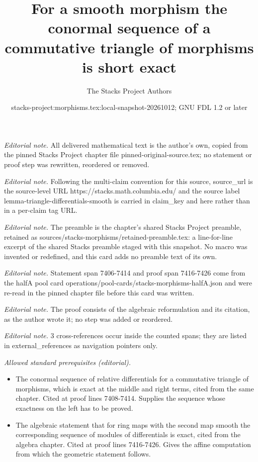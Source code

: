 \documentclass[10pt,a4paper]{amsart}
\title{For a smooth morphism the conormal sequence of a commutative triangle of morphisms is short exact}
\author{The Stacks Project Authors}
\date{stacks-project:morphisms.tex:local-snapshot-20261012; GNU FDL 1.2 or later}
\theoremstyle{plain}
\theoremstyle{definition}
\theoremstyle{remark}
\numberwithin{equation}{subsection}
\begin{document}
\maketitle
\noindent\textit{Editorial note.} All delivered mathematical text is the author's own, copied from the pinned Stacks Project chapter file pinned-original-source.tex; no statement or proof step was rewritten, reordered or removed.\par\medskip
\noindent\textit{Editorial note.} Following the multi-claim convention for this source, source\_url is the source-level URL https://stacks.math.columbia.edu/ and the source label lemma-triangle-differentials-smooth is carried in claim\_key and here rather than in a per-claim tag URL.\par\medskip
\noindent\textit{Editorial note.} The preamble is the chapter's shared Stacks Project preamble, retained as sources/stacks-morphisms/retained-preamble.tex: a line-for-line excerpt of the shared Stacks preamble staged with this snapshot. No macro was invented or redefined, and this card adds no preamble text of its own.\par\medskip
\noindent\textit{Editorial note.} Statement span 7406-7414 and proof span 7416-7426 come from the halfA pool card operations/pool-cards/stacks-morphisms-halfA.json and were re-read in the pinned chapter file before this card was written.\par\medskip
\noindent\textit{Editorial note.} The proof consists of the algebraic reformulation and its citation, as the author wrote it; no step was added or reordered.\par\medskip
\noindent\textit{Editorial note.} 3 cross-references occur inside the counted spans; they are listed in external\_references as navigation pointers only.\par\medskip
\noindent\textit{Allowed standard prerequisites (editorial).}\begin{itemize}
\item The conormal sequence of relative differentials for a commutative triangle of morphisms, which is exact at the middle and right terms, cited from the same chapter. Cited at proof lines 7408-7414. Supplies the sequence whose exactness on the left has to be proved.
\item The algebraic statement that for ring maps with the second map smooth the corresponding sequence of modules of differentials is exact, cited from the algebra chapter. Cited at proof lines 7416-7426. Gives the affine computation from which the geometric statement follows.
\end{itemize}\medskip
\end{document}

